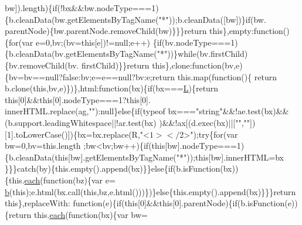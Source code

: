 \begin{DoxyCode}
{      bw]).length)\{\textcolor{keywordflow}{if}(!bx&&bw.nodeType===1)\{b.cleanData(bw.getElementsByTagName(\textcolor{stringliteral}{"*"}));b.cleanData([bw])\}\textcolor{keywordflow}{if}(bw.
      parentNode)\{bw.parentNode.removeChild(bw)\}\}\}\textcolor{keywordflow}{return} \textcolor{keyword}{this}\},empty:\textcolor{keyword}{function}()\{\textcolor{keywordflow}{for}(var e=0,bv;(bv=\textcolor{keyword}{this}[e])!=null;e++)
      \{\textcolor{keywordflow}{if}(bv.nodeType===1)\{b.cleanData(bv.getElementsByTagName(\textcolor{stringliteral}{"*"}))\}\textcolor{keywordflow}{while}(bv.firstChild)\{bv.removeChild(bv.
      firstChild)\}\}\textcolor{keywordflow}{return} \textcolor{keyword}{this}\},clone:\textcolor{keyword}{function}(bv,e)\{bv=bv==null?\textcolor{keyword}{false}:bv;e=e==null?bv:e;\textcolor{keywordflow}{return} this.map(\textcolor{keyword}{function}()\{\textcolor{keywordflow}{
      return} b.clone(\textcolor{keyword}{this},bv,e)\})\},html:\textcolor{keyword}{function}(bx)\{\textcolor{keywordflow}{if}(bx===\hyperlink{jquery_8js_a38ee4c0b5f4fe2a18d0c783af540d253}{L})\{\textcolor{keywordflow}{return} \textcolor{keyword}{this}[0]&&\textcolor{keyword}{this}[0].nodeType===1?\textcolor{keyword}{this}[0].
      innerHTML.replace(ag,\textcolor{stringliteral}{""}):null\}\textcolor{keywordflow}{else}\{\textcolor{keywordflow}{if}(typeof bx===\textcolor{stringliteral}{"string"}&&!ae.test(bx)&&(b.support.leadingWhitespace||!ar.test(bx)
      )&&!ax[(d.exec(bx)||[\textcolor{stringliteral}{""},\textcolor{stringliteral}{""}])[1].toLowerCase()])\{bx=bx.replace(R,\textcolor{stringliteral}{"<$1></$2>"});\textcolor{keywordflow}{try}\{\textcolor{keywordflow}{for}(var bw=0,bv=this.length
      ;bw<bv;bw++)\{\textcolor{keywordflow}{if}(\textcolor{keyword}{this}[bw].nodeType===1)\{b.cleanData(\textcolor{keyword}{this}[bw].getElementsByTagName(\textcolor{stringliteral}{"*"}));\textcolor{keyword}{this}[bw].innerHTML=bx
      \}\}\}\textcolor{keywordflow}{catch}(by)\{this.empty().append(bx)\}\}\textcolor{keywordflow}{else}\{\textcolor{keywordflow}{if}(b.isFunction(bx))\{this.\hyperlink{jquery_8js_a871ff39db627c54c710a3e9909b8234c}{each}(\textcolor{keyword}{function}(bz)\{var e=
      \hyperlink{jquery_8js_aa4026ad5544b958e54ce5e106fa1c805}{b}(\textcolor{keyword}{this});e.html(bx.call(\textcolor{keyword}{this},bz,e.html()))\})\}\textcolor{keywordflow}{else}\{this.empty().append(bx)\}\}\}\textcolor{keywordflow}{return} \textcolor{keyword}{this}\},replaceWith:\textcolor{keyword}{
      function}(e)\{\textcolor{keywordflow}{if}(\textcolor{keyword}{this}[0]&&\textcolor{keyword}{this}[0].parentNode)\{\textcolor{keywordflow}{if}(b.isFunction(e))\{\textcolor{keywordflow}{return} this.\hyperlink{jquery_8js_a871ff39db627c54c710a3e9909b8234c}{each}(\textcolor{keyword}{function}(bx)\{var bw=
}
\end{DoxyCode}
